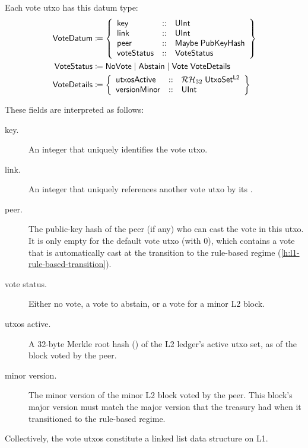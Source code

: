 \documentclass[../hydrozoa.tex]{subfiles}
\begin{document}
Each vote utxo has this datum type:
\begin{equation*}
\begin{split}
  \mathsf{VoteDatum} &\coloneq \left\{
    \begin{array}{lll}
      \mathsf{key}  &::& \mathsf{UInt} \\
      \mathsf{link} &::& \mathsf{UInt} \\
      \mathsf{peer} &::& \mathsf{Maybe} \; \mathsf{PubKeyHash} \\
      \mathsf{voteStatus} &::& \mathsf{VoteStatus}
    \end{array}\right\}\\
  \mathsf{VoteStatus} &\coloneq \mathsf{NoVote} \mid \mathsf{Abstain} \mid \mathsf{Vote} \; \mathsf{VoteDetails} \\
  \mathsf{VoteDetails} &\coloneq \left\{
    \begin{array}{lll}
      \mathsf{utxosActive} &::& \mathcal{RH}_{32} \; \mathsf{UtxoSet^{L2}} \\
      \mathsf{versionMinor} &::& \mathsf{UInt}
    \end{array}\right\}
\end{split}
\end{equation*}

These fields are interpreted as follows:
\begin{description}
  \item[key.] An integer that uniquely identifies the vote utxo.
  \item[link.] An integer that uniquely references another vote utxo by its .
  \item[peer.] The public-key hash of the peer (if any) who can cast the vote in this utxo.
  It is only empty for the default vote utxo (with  0), which contains a vote that is automatically cast at the transition to the rule-based regime (\cref{h:l1-rule-based-transition}).
  \item[vote status.] Either no vote, a vote to abstain, or a vote for a minor L2 block.
  \item[utxos active.] A 32-byte Merkle root hash () of the L2 ledger's active utxo set, as of the block voted by the peer.
  \item[minor version.] The minor version of the minor L2 block voted by the peer.
  This block's major version must match the major version that the treasury had when it transitioned to the rule-based regime.
\end{description}

Collectively, the vote utxos constitute a linked list data structure on L1.
\end{document}
